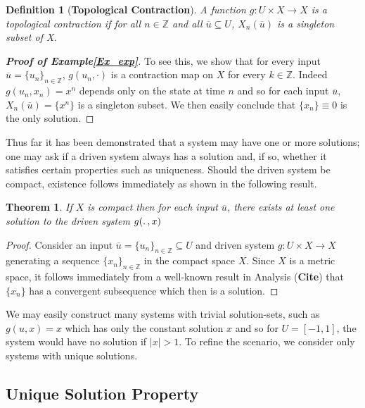 \documentclass[12 pt]{article}
\newtheorem{Definition}{Definition}[]
\newtheorem{Theorem}{Theorem}[]
\begin{document}
\begin{Definition}
  [\bf Topological Contraction]\label{Dfn_TopContr}
  A function $g:U\times{X}\to{X}$ is a topological contraction if for all $n\in\mathbb{Z}$ and all $\overline{u}\subseteq{U}$, $X_n(\overline{u})$ is a singleton subset of X.  
\end{Definition}

\begin{proof}
  [\bf Proof of Example\ref{Ex_exp}] 
  To see this, we show that for every input $\overline{u}=\{u_n\}_{n\in\mathbb{Z}}$, $g(u_n,\cdot)$ is a contraction map on $X$ for every $k\in\mathbb{Z}$. 
  Indeed $g(u_n,x_n)=x^n$ depends only on the state at time $n$ and so for each input $\overline{u}$, $X_n(\overline{u})=\{x^n\}$ is a singleton subset.
  We then easily conclude that $\{x_n\}\equiv0$ is the only solution. 
\end{proof}

Thus far it has been demonstrated that a system may have one or more solutions; one may ask if a driven system always has a solution and, if so, whether it satisfies certain properties such as uniqueness. 
Should the driven system be compact, existence follows immediately as shown in the following result.

\begin{Theorem}\label{Thm_CompactExistence}
  If $X$ is compact then for each input $\overline{u}$, there exists at least one solution to the driven system $g(\ldotp, x)$
\end{Theorem}
\begin{proof}
  Consider an input $\overline{u}={\{u_n\}}_{n\in\mathbb{Z}}\subseteq{U}$ and driven system $g:U\times{X}\to{X}$  generating a sequence ${\{x_n\}}_{n\in\mathbb{Z}}$ in the compact space $X$. 
  Since $X$ is a metric space, it follows immediately from a well-known result in Analysis (\textbf{Cite}) that $\{x_n\}$ has a convergent subsequence which then is a solution. 
\end{proof}

We may easily construct many systems with trivial solution-sets, such as $g(u,x)=x$ which has only the constant solution $x$ and so for $U=[-1,1]$, the system would have no solution if $|x|>1$. To refine the scenario, we consider only systems with unique solutions. 

\subsection {Unique Solution Property}
\end{document}
